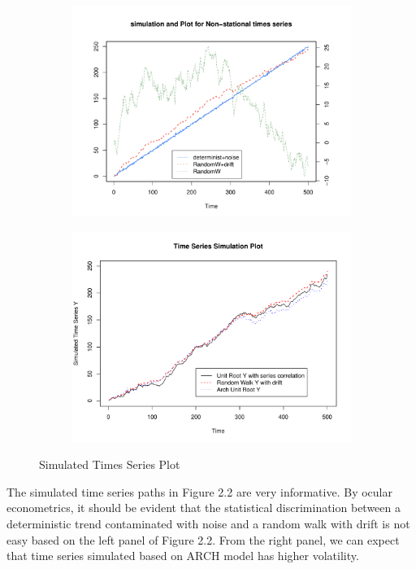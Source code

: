 \documentclass[12pt]{article}
\theoremstyle{definition}
\numberwithin{equation}{section}
\numberwithin{figure}{section}
\numberwithin{table}{section}
\begin{document}
\begin{figure}[H]
  \centering
  \begin{subfigure}[b]{0.45\textwidth}
    \centering
    \includegraphics[width=\textwidth]{../Figures/NonStation}
  \end{subfigure}
  \begin{subfigure}[b]{0.45\textwidth}
    \centering
    \includegraphics[width=\textwidth]{../Figures/UnitRootSm}
  \end{subfigure}
  \caption{Simulated Times Series Plot}
\end{figure}

The simulated time series paths in Figure 2.2 are very informative. By ocular econometrics, it should be evident that the statistical discrimination between a deterministic trend contaminated with noise and a random walk with drift is not easy based on the left panel of Figure 2.2. From the right panel, we can expect that time series simulated based on ARCH model has higher volatility.
\end{document}
